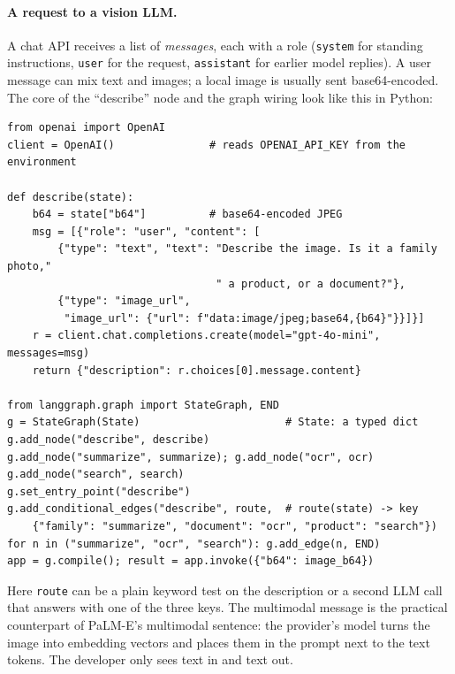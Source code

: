 \paragraph{A request to a vision LLM.}
A chat API receives a list of \emph{messages}, each with a role
(\texttt{system} for standing instructions, \texttt{user} for the request,
\texttt{assistant} for earlier model replies). A user message can mix text
and images; a local image is usually sent base64-encoded. The core of the
``describe'' node and the graph wiring look like this in Python:

\begin{small}
\begin{verbatim}
from openai import OpenAI
client = OpenAI()               # reads OPENAI_API_KEY from the environment

def describe(state):
    b64 = state["b64"]          # base64-encoded JPEG
    msg = [{"role": "user", "content": [
        {"type": "text", "text": "Describe the image. Is it a family photo,"
                                 " a product, or a document?"},
        {"type": "image_url",
         "image_url": {"url": f"data:image/jpeg;base64,{b64}"}}]}]
    r = client.chat.completions.create(model="gpt-4o-mini", messages=msg)
    return {"description": r.choices[0].message.content}

from langgraph.graph import StateGraph, END
g = StateGraph(State)                       # State: a typed dict
g.add_node("describe", describe)
g.add_node("summarize", summarize); g.add_node("ocr", ocr)
g.add_node("search", search)
g.set_entry_point("describe")
g.add_conditional_edges("describe", route,  # route(state) -> key
    {"family": "summarize", "document": "ocr", "product": "search"})
for n in ("summarize", "ocr", "search"): g.add_edge(n, END)
app = g.compile(); result = app.invoke({"b64": image_b64})
\end{verbatim}
\end{small}

\noindent
Here \texttt{route} can be a plain keyword test on the description or a
second LLM call that answers with one of the three keys. The multimodal
message is the practical counterpart of PaLM-E's multimodal sentence: the
provider's model turns the image into embedding vectors and places them in
the prompt next to the text tokens. The developer only sees text in and text
out.

